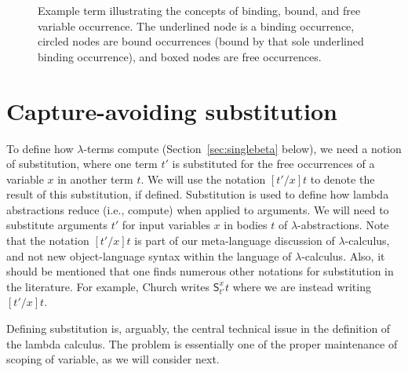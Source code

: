 \begin{figure}
\large
\begin{center}
    \end{center}
    \caption{Example term illustrating the concepts of binding, bound, and free variable occurrence.  The underlined node is a binding occurrence, circled nodes are bound occurrences (bound by that sole underlined binding occurrence), and boxed nodes are free occurrences.}
    \label{fig:varocc}

\end{figure}

\section{Capture-avoiding substitution}
\label{sec:subst}

To define how $\lambda$-terms compute (Section~\ref{sec:singlebeta}
below), we need a notion of substitution, where one term $t'$ is
substituted for the free occurrences of a variable $x$ in another term
$t$.  We will use the notation $[t'/x]t$ to denote the result of this
substitution, if defined.
Substitution is used to define how lambda abstractions reduce (i.e.,
compute) when applied to arguments.  We will need to substitute
arguments $t'$ for input variables $x$ in bodies $t$ of
$\lambda$-abstractions.  Note that the notation $[t'/x]t$ is part of
our meta-language discussion of $\lambda$-calculus, and not new
object-language syntax within the language of $\lambda$-calculus.
Also, it should be mentioned that one finds numerous other notations
for substitution in the literature.  For example, Church writes
$\textsf{S}^x_{t'} t$ where we are instead writing $[t'/x]t$.

Defining substitution is, arguably, the central technical issue
in the definition of the lambda calculus.  The problem is essentially
one of the proper maintenance of scoping of variable, as we will
consider next.

